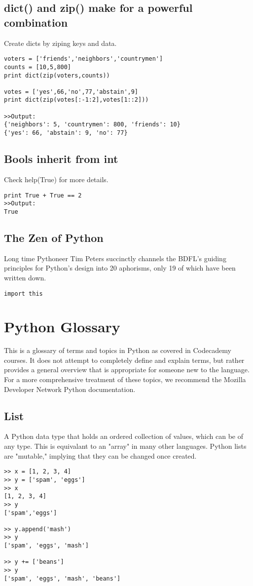 \documentclass[12pt,a4paper,final,twoside,onecolumn,titlepage]{book}
\begin{document}
\section{dict() and zip() make for a powerful combination}
Create dicts by ziping keys and data.
\begin{lstlisting}
voters = ['friends','neighbors','countrymen']
counts = [10,5,800]
print dict(zip(voters,counts))

votes = ['yes',66,'no',77,'abstain',9]
print dict(zip(votes[:-1:2],votes[1::2]))

>>Output:
{'neighbors': 5, 'countrymen': 800, 'friends': 10}
{'yes': 66, 'abstain': 9, 'no': 77}
\end{lstlisting}

\section{Bools inherit from int}
Check help(True) for more details.
\begin{lstlisting}
print True + True == 2
>>Output:
True
\end{lstlisting}


\section{The Zen of Python}
Long time Pythoneer Tim Peters succinctly channels the BDFL's guiding principles for Python's design into 20 aphorisms, only 19 of which have been written down.
\begin{lstlisting}
import this
\end{lstlisting}

\chapter{Python Glossary}
This is a glossary of terms and topics in Python as covered in Codecademy courses. It does not attempt to completely define and explain terms, but rather provides a general overview that is appropriate for someone new to the language. For a more comprehensive treatment of these topics, we recommend the Mozilla Developer Network Python documentation.

\section{List}
 A Python data type that holds an ordered collection of values, which can be of any type. This is equivalant to an "array" in many other languages. Python lists are "mutable," implying that they can be changed once created.
\lstset{language=Python, tabsize=4}
\begin{lstlisting}
>> x = [1, 2, 3, 4]
>> y = ['spam', 'eggs']
>> x
[1, 2, 3, 4]
>> y
['spam','eggs']

>> y.append('mash')
>> y
['spam', 'eggs', 'mash']

>> y += ['beans']
>> y
['spam', 'eggs', 'mash', 'beans']
\end{lstlisting}
\end{document}
